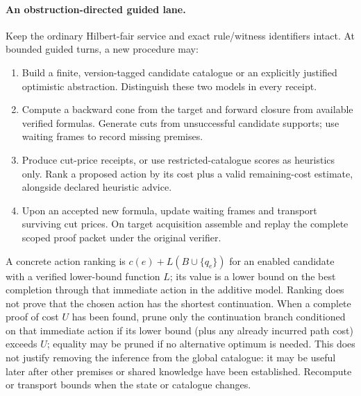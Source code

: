 \documentclass[11pt]{article}
\theoremstyle{remark}\newtheorem{remark}[theorem]{Remark}
\begin{document}
\paragraph{An obstruction-directed guided lane.} Keep the ordinary Hilbert-fair service and exact rule/witness identifiers intact. At bounded guided turns, a new procedure may:
\begin{enumerate}
\item Build a finite, version-tagged candidate catalogue or an explicitly justified optimistic abstraction. Distinguish these two models in every receipt.
\item Compute a backward cone from the target and forward closure from available verified formulas. Generate cuts from unsuccessful candidate supports; use waiting frames to record missing premises.
\item Produce cut-price receipts, or use restricted-catalogue scores as heuristics only. Rank a proposed action by its cost plus a valid remaining-cost estimate, alongside declared heuristic advice.
\item Upon an accepted new formula, update waiting frames and transport surviving cut prices. On target acquisition assemble and replay the complete scoped proof packet under the original verifier.
\end{enumerate}
A concrete action ranking is $c(e)+L(B\cup\{q_e\})$ for an enabled candidate with a verified lower-bound function $L$; its value is a lower bound on the best completion through that immediate action in the additive model. Ranking does not prove that the chosen action has the shortest continuation. When a complete proof of cost $U$ has been found, prune only the continuation branch conditioned on that immediate action if its lower bound (plus any already incurred path cost) exceeds $U$; equality may be pruned if no alternative optimum is needed. This does not justify removing the inference from the global catalogue: it may be useful later after other premises or shared knowledge have been established. Recompute or transport bounds when the state or catalogue changes.
\end{document}
